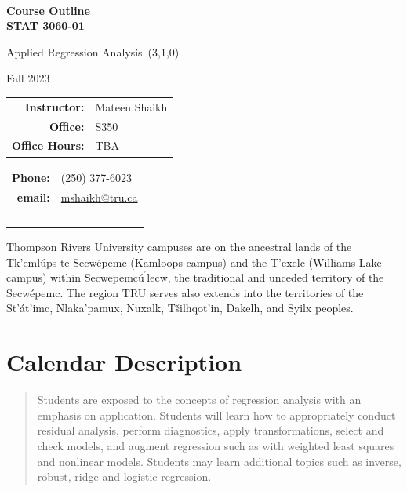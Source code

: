 \documentclass[10pt]{trumathoutline}
\makeatletter
\newcommand{\instructorname}     {Mateen Shaikh}
\newcommand{\instructorphone}    {(250) 377-6023}
\newcommand{\instructoremail}    {mshaikh@tru.ca}
\newcommand{\instructorofficehrs}{TBA}
\newcommand{\instructorofficerm} {S350}
\newcommand{\coursecode}     	 {STAT 3060-01}
\newcommand{\coursetitle}    	 {Applied Regression Analysis}
\newcommand{\coursevectoring}	 {(3,1,0)}
\newcommand{\term}           	 {Fall 2023}
\newcommand{\calendardescription}{
	Students are exposed to the concepts of regression analysis with an emphasis on application. Students will learn how to appropriately conduct residual analysis, perform diagnostics, apply transformations, select and check models, and augment regression such as with weighted least squares and nonlinear models. Students may learn additional topics such as inverse, robust, ridge and logistic regression.
}
\newcommand{\coursedescription}{
}
\makeatother
\begin{document}
	
	~
	
	\vspace{-1em}
	
	\begin{center}
		\bfseries
		{\Large \underline{Course Outline}}\\[0.5em]
		
		\coursecode
		
		\coursetitle\ \coursevectoring
		
		\term
		
	\end{center}
\begin{tabular}{ r l}
	\textbf{Instructor:}	& \instructorname 	\\
	\textbf{Office:} 		& \instructorofficerm \\
	\textbf{Office Hours:} 	& \instructorofficehrs
\end{tabular}\hfill
\begin{tabular}{ r l}
	 \textbf{Phone:} & \instructorphone\\
	 \textbf{email:} & \href{mailto:\instructoremail}{\instructoremail}\\
	~
\end{tabular}

\vspace{1em}




Thompson Rivers University campuses are on the ancestral lands of the Tk'eml\'ups te Secw\'epemc (Kamloops campus) and the T'exelc (Williams Lake campus) within Secwepemc\'u$^{^{'}}$\hspace{-4pt}lecw, the traditional and unceded territory of the Secw\'epemc. The region TRU serves also extends into the territories of the St'\'at'imc, Nlaka'pamux, Nuxalk, T\v{s}ilhqot'in, Dakelh, and Syilx peoples.

\section*{Calendar Description}
\begin{quote}
	\calendardescription
\end{quote}
	
\end{document}
